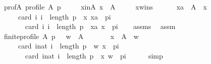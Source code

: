 \begin{isabellebody}
\ \ \ \ prof{\isacharunderscore}{\kern0pt}A{\isacharcolon}{\kern0pt}\ {\isachardoublequoteopen}profile\ A\ p{\isachardoublequoteclose}\ \isanewline
\ \ \ \ x{\isacharunderscore}{\kern0pt}in{\isacharunderscore}{\kern0pt}A{\isacharcolon}{\kern0pt}\ {\isachardoublequoteopen}x\ {\isasymin}\ A{\isachardoublequoteclose}\ \isanewline
\ \ \ \ x{\isacharunderscore}{\kern0pt}wins{\isacharcolon}{\kern0pt}\isanewline
\ \ \ \ \ \ {\isachardoublequoteopen}{\isasymforall}xa\ {\isasymin}\ A\ {\isacharminus}{\kern0pt}\ {\isacharbraceleft}{\kern0pt}x{\isacharbraceright}{\kern0pt}{\isachardot}{\kern0pt}\isanewline
\ \ \ \ \ \ \ \ card\ {\isacharbraceleft}{\kern0pt}i{\isachardot}{\kern0pt}\ i\ {\isacharless}{\kern0pt}\ length\ p\ {\isasymand}\ {\isacharparenleft}{\kern0pt}x{\isacharcomma}{\kern0pt}\ xa{\isacharparenright}{\kern0pt}\ {\isasymin}\ p{\isacharbang}{\kern0pt}i{\isacharbraceright}{\kern0pt}\ {\isacharless}{\kern0pt}\isanewline
\ \ \ \ \ \ \ \ \ \ card\ {\isacharbraceleft}{\kern0pt}i{\isachardot}{\kern0pt}\ i\ {\isacharless}{\kern0pt}\ length\ p\ {\isasymand}\ {\isacharparenleft}{\kern0pt}xa{\isacharcomma}{\kern0pt}\ x{\isacharparenright}{\kern0pt}\ {\isasymin}\ p{\isacharbang}{\kern0pt}i{\isacharbraceright}{\kern0pt}{\isachardoublequoteclose}\isanewline
\ \ \isamarkupfalse%
\ assms\ \isamarkupfalse%
\ assm{\isacharcolon}{\kern0pt}\isanewline
\ \ \ \ {\isachardoublequoteopen}finite{\isacharunderscore}{\kern0pt}profile\ A\ p\ {\isasymand}\ \ w\ {\isasymin}\ A\ {\isasymand}\isanewline
\ \ \ \ \ \ {\isacharparenleft}{\kern0pt}{\isasymforall}x\ {\isasymin}\ A\ {\isacharminus}{\kern0pt}\ {\isacharbraceleft}{\kern0pt}w{\isacharbraceright}{\kern0pt}{\isachardot}{\kern0pt}\isanewline
\ \ \ \ \ \ \ \ card\ {\isacharbraceleft}{\kern0pt}i{\isacharcolon}{\kern0pt}{\isacharcolon}{\kern0pt}nat{\isachardot}{\kern0pt}\ i\ {\isacharless}{\kern0pt}\ length\ p\ {\isasymand}\ {\isacharparenleft}{\kern0pt}w{\isacharcomma}{\kern0pt}\ x{\isacharparenright}{\kern0pt}\ {\isasymin}\ p{\isacharbang}{\kern0pt}i{\isacharbraceright}{\kern0pt}\ {\isacharless}{\kern0pt}\isanewline
\ \ \ \ \ \ \ \ \ \ card\ {\isacharbraceleft}{\kern0pt}i{\isacharcolon}{\kern0pt}{\isacharcolon}{\kern0pt}nat{\isachardot}{\kern0pt}\ i\ {\isacharless}{\kern0pt}\ length\ p\ {\isasymand}\ {\isacharparenleft}{\kern0pt}x{\isacharcomma}{\kern0pt}\ w{\isacharparenright}{\kern0pt}\ {\isasymin}\ p{\isacharbang}{\kern0pt}i{\isacharbraceright}{\kern0pt}{\isacharparenright}{\kern0pt}{\isachardoublequoteclose}\isanewline
\ \ \ \ \isamarkupfalse%
\ simp\isanewline

\end{isabellebody}
